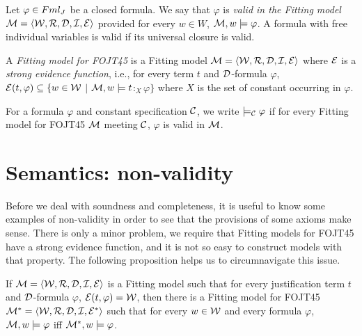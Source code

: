 \begin{defn}
	Let $\varphi \in Fml_{J}$ be a closed formula. We say that $\varphi$ is \textit{valid in the Fitting model} $\mathcal{M} = \langle\mathcal{W},\mathcal{R},\mathcal{D},\mathcal{I},\mathcal{E} \rangle$ provided for every $w \in W$, $\mathcal{M},w \models \varphi$. A formula with free individual variables is valid if its universal closure is valid.
\end{defn}


\begin{defn}
	A \textit{Fitting model for FOJT45} is a Fitting model $\mathcal{M} = \langle\mathcal{W},\mathcal{R},\mathcal{D},\mathcal{I},\mathcal{E} \rangle$ where $\mathcal{E}$ is a \textit{strong evidence function}, i.e., for every term $t$ and $\mathcal{D}$-formula $\varphi$, $\mathcal{E}(t,\varphi) \subseteq \{w \in \mathcal{W}$ $|$ $ \mathcal{M},w \models t$$:_{X}$$\varphi\}$ where $X$ is the set of constant occurring in $\varphi$.
	
	
	\qquad For a formula $\varphi$ and constant specification $\mathcal{C}$, we write $\models_{\mathcal{C}}\varphi$ if for every Fitting model for FOJT45 $\mathcal{M}$ meeting $\mathcal{C}$, $\varphi$ is valid in $\mathcal{M}$.
\end{defn}



\section{Semantics: non-validity}

\qquad Before we deal with soundness and completeness, it is useful to know some examples of non-validity in order to see that the provisions of some axioms make sense. There is only a minor problem, we require that Fitting models for FOJT45 have a strong evidence function, and it is not so easy to construct models with that property. The following proposition helps us to circumnavigate this issue.


\begin{pro}
	If $\mathcal{M} = \langle\mathcal{W},\mathcal{R},\mathcal{D},\mathcal{I},\mathcal{E} \rangle$ is a Fitting model such that for every justification term $t$ and $\mathcal{D}$-formula $\varphi$, $\mathcal{E}(t,\varphi) = \mathcal{W}$, then there is a Fitting model for FOJT45 $\mathcal{M}^{*} = \langle\mathcal{W},\mathcal{R},\mathcal{D},\mathcal{I},\mathcal{E}^{*} \rangle$ such that for every $w \in \mathcal{W}$ and every formula $\varphi$, $\mathcal{M},w \models \varphi$ iff $\mathcal{M}^{*},w \models \varphi$.   
\end{pro}

